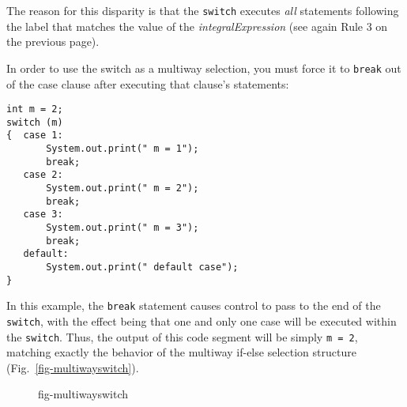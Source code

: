 \noindent The reason for this disparity is that the {\tt switch}
executes {\it all} statements following the label that matches the
value of the {\it integralExpression} (see again Rule 3 on the
previous page).

In order to use the switch as a multiway selection, you must force it
to {\tt break} out of the case clause after executing
that clause's statements:

\begin{jjjlisting}
\begin{lstlisting}
int m = 2;
switch (m)
{  case 1:
       System.out.print(" m = 1");
       break;
   case 2:
       System.out.print(" m = 2");
       break;
   case 3:
       System.out.print(" m = 3");
       break;
   default:
       System.out.print(" default case");
}
\end{lstlisting}
\end{jjjlisting}


\noindent In this example, the {\tt break} statement causes control to
pass to the end of the {\tt switch}, with the effect being that one
and only one case will be executed within the {\tt switch}. Thus, the
output of this code segment will be simply \mbox{\tt m = 2}, matching
exactly the behavior of the multiway if-else selection structure
(Fig.~\ref{fig-multiwayswitch}).

\begin{figure}[hbt]
{fig-multiwayswitch}

\end{figure}






